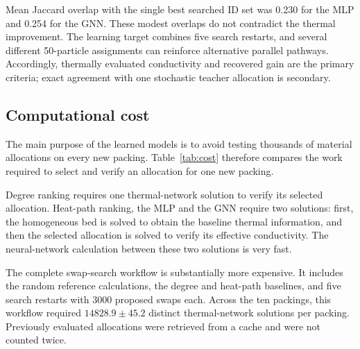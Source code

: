 \documentclass[12pt,a4paper]{article}
\begin{document}
	Mean Jaccard overlap with the single best searched ID set was 0.230 for the MLP
	and 0.254 for the GNN. These modest overlaps do not contradict the thermal
	improvement. The learning target combines five search restarts, and several
	different 50-particle assignments can reinforce alternative parallel pathways.
	Accordingly, thermally evaluated conductivity and recovered gain are the primary
	criteria; exact agreement with one stochastic teacher allocation is secondary.

\subsection{Computational cost}

The main purpose of the learned models is to avoid testing thousands of material
allocations on every new packing. Table~\ref{tab:cost} therefore compares the
work required to select and verify an allocation for one new packing.

Degree ranking requires one thermal-network solution to verify its selected
allocation. Heat-path ranking, the MLP and the GNN require two solutions: first,
the homogeneous bed is solved to obtain the baseline thermal information, and
then the selected allocation is solved to verify its effective conductivity.
The neural-network calculation between these two solutions is very fast.

The complete swap-search workflow is substantially more expensive. It includes
the random reference calculations, the degree and heat-path baselines, and five
search restarts with 3000 proposed swaps each. Across the ten packings, this
workflow required $14828.9\pm45.2$ distinct thermal-network solutions per
packing. Previously evaluated allocations were retrieved from a cache and were
not counted twice.
\end{document}
